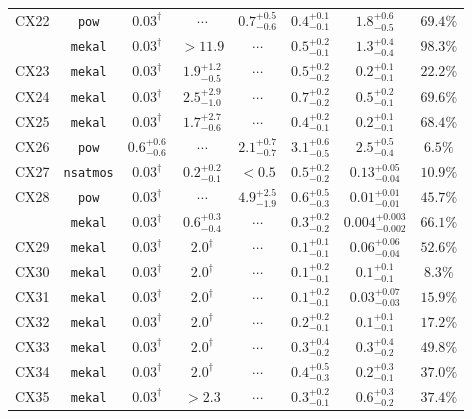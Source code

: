 \documentclass[fleqn,usenatbib]{mnras}
\newcommand\nodata{ ~$\cdots$~ }%
\newcommand{\nd}{\nodata}
\begin{document}
\begin{table*}
\begin{tabular}{lccccccc}
      \hline
      \multirow{2}{*}{CX22}& {\tt pow} & $0.03^\dag$  & \nd & $0.7^{+0.5}_{-0.6}$ & $0.4^{+0.1}_{-0.1}$ & $1.8^{+0.6}_{-0.5}$ & $69.4\%$ \\
                           & {\tt mekal} & $0.03^\dag$ & $>11.9$ & \nd & $0.5^{+0.2}_{-0.1}$ & $1.3^{+0.4}_{-0.4}$ & $98.3\%$ \\ 
      \hline
      CX23   & {\tt mekal} & $0.03^\dag$ & $1.9^{+1.2}_{-0.5}$ & \nd & $0.5^{+0.2}_{-0.2}$ & $0.2^{+0.1}_{-0.1}$ & $22.2\%$ \\
      CX24   & {\tt mekal} & $0.03^\dag$ & $2.5^{+2.9}_{-1.0}$ & \nd & $0.7^{+0.2}_{-0.2}$ & $0.5^{+0.2}_{-0.1}$ & $69.6\%$ \\
      CX25   & {\tt mekal} & $0.03^\dag$ & $1.7^{+2.7}_{-0.6}$ & \nd & $0.4^{+0.2}_{-0.1}$ & $0.2^{+0.1}_{-0.1}$ & $68.4\%$ \\
      CX26   & {\tt pow} & $0.6^{+0.6}_{-0.6}$ & \nd & $2.1^{+0.7}_{-0.7}$ & $3.1^{+0.6}_{-0.5}$ & $2.5^{+0.5}_{-0.4}$ & $6.5\%$ \\ 
      CX27   & {\tt nsatmos} & $0.03^\dag$ & $0.2^{+0.2}_{-0.1}$ & $<0.5$ & $0.5^{+0.2}_{-0.2}$ & $0.13^{+0.05}_{-0.04}$ & $10.9\%$ \\
      \hline
      \multirow{2}{*}{CX28}  & {\tt pow} & $0.03^\dag$ & \nd & $4.9^{+2.5}_{-1.9}$ & $0.6^{+0.5}_{-0.3}$ & $0.01^{+0.01}_{-0.01}$ & $45.7\%$ \\
                             & {\tt mekal} & $0.03^\dag$ & $0.6^{+0.3}_{-0.4}$ & \nd & $0.3^{+0.2}_{-0.2}$ & $0.004^{+0.003}_{-0.002}$ & $66.1\%$ \\
      \hline
      CX29   & {\tt mekal} & $0.03^\dag$ & $2.0^\dag$ & \nd & $0.1^{+0.1}_{-0.1}$ & $0.06^{+0.06}_{-0.04}$ & $52.6\%$\\
      CX30   & {\tt mekal} & $0.03^\dag$ & $2.0^\dag$ & \nd & $0.1^{+0.2}_{-0.1}$ & $0.1^{+0.1}_{-0.1}$ & $8.3\%$ \\
      CX31   & {\tt mekal} & $0.03^\dag$ & $2.0^\dag$ & \nd & $0.1^{+0.2}_{-0.1}$ & $0.03^{+0.07}_{-0.03}$ & $15.9\%$ \\
      CX32   & {\tt mekal} & $0.03^\dag$ & $2.0^\dag$ & \nd & $0.2^{+0.2}_{-0.1}$ & $0.1^{+0.1}_{-0.1}$ & $17.2\%$ \\
      CX33   & {\tt mekal} & $0.03^\dag$ & $2.0^\dag$ & \nd & $0.3^{+0.4}_{-0.2}$ & $0.3^{+0.4}_{-0.2}$ & $49.8\%$ \\
      CX34   & {\tt mekal} & $0.03^\dag$ & $2.0^\dag$ & \nd & $0.4^{+0.5}_{-0.3}$ & $0.2^{+0.3}_{-0.1}$ & $37.0\%$ \\
      CX35   & {\tt mekal} & $0.03^\dag$ & $>2.3$ & \nd & $0.3^{+0.2}_{-0.1}$ & $0.6^{+0.3}_{-0.2}$ & $37.4\%$ \\

\end{tabular}
\end{table*}
\end{document}
